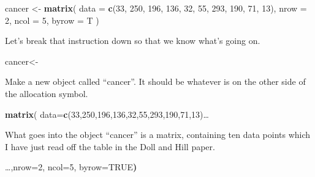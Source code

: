 \documentclass[
]{book}
\newenvironment{Shaded}{\begin{snugshade}}{\end{snugshade}}
\newcommand{\DataTypeTok}[1]{\textcolor[rgb]{0.13,0.29,0.53}{#1}}
\newcommand{\DecValTok}[1]{\textcolor[rgb]{0.00,0.00,0.81}{#1}}
\newcommand{\ErrorTok}[1]{\textcolor[rgb]{0.64,0.00,0.00}{\textbf{#1}}}
\newcommand{\KeywordTok}[1]{\textcolor[rgb]{0.13,0.29,0.53}{\textbf{#1}}}
\newcommand{\NormalTok}[1]{#1}
\newcommand{\OtherTok}[1]{\textcolor[rgb]{0.56,0.35,0.01}{#1}}
\newcommand{\StringTok}[1]{\textcolor[rgb]{0.31,0.60,0.02}{#1}}
\begin{document}
\begin{Shaded}
\begin{Highlighting}[]
\NormalTok{cancer <-}
\StringTok{  }\KeywordTok{matrix}\NormalTok{(}
    \DataTypeTok{data =} \KeywordTok{c}\NormalTok{(}\DecValTok{33}\NormalTok{, }\DecValTok{250}\NormalTok{, }\DecValTok{196}\NormalTok{, }\DecValTok{136}\NormalTok{, }\DecValTok{32}\NormalTok{, }\DecValTok{55}\NormalTok{, }\DecValTok{293}\NormalTok{, }\DecValTok{190}\NormalTok{, }\DecValTok{71}\NormalTok{, }\DecValTok{13}\NormalTok{),}
    \DataTypeTok{nrow =} \DecValTok{2}\NormalTok{,}
    \DataTypeTok{ncol =} \DecValTok{5}\NormalTok{,}
    \DataTypeTok{byrow =}\NormalTok{ T}
\NormalTok{  )}
\end{Highlighting}
\end{Shaded}

Let's break that instruction down so that we know what's going on.

\begin{Shaded}
\begin{Highlighting}[]
\NormalTok{cancer<-}
\end{Highlighting}
\end{Shaded}

Make a new object called ``cancer''. It should be whatever is on the other side of the allocation symbol.

\begin{Shaded}
\begin{Highlighting}[]
\KeywordTok{matrix}\NormalTok{(}
  \DataTypeTok{data=}\KeywordTok{c}\NormalTok{(}\DecValTok{33}\NormalTok{,}\DecValTok{250}\NormalTok{,}\DecValTok{196}\NormalTok{,}\DecValTok{136}\NormalTok{,}\DecValTok{32}\NormalTok{,}\DecValTok{55}\NormalTok{,}\DecValTok{293}\NormalTok{,}\DecValTok{190}\NormalTok{,}\DecValTok{71}\NormalTok{,}\DecValTok{13}\NormalTok{)…}
\end{Highlighting}
\end{Shaded}

What goes into the object ``cancer'' is a matrix, containing ten data points which I have just read off the table in the Doll and Hill paper.

\begin{Shaded}
\begin{Highlighting}[]
\NormalTok{  …,nrow=}\DecValTok{2}\NormalTok{, }
\NormalTok{    ncol=}\DecValTok{5}\NormalTok{, }
\NormalTok{    byrow=}\OtherTok{TRUE}\ErrorTok{)}
\end{Highlighting}
\end{Shaded}
\end{document}
